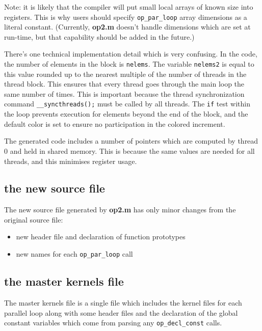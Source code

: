 \documentclass[12pt]{article}
\begin{document}
\newpage

Note: it is likely that the compiler will put small local arrays of 
known size into registers.  This is why users should specify
{\tt op\_par\_loop} array dimensions as a literal constant.
(Currently, {\bf op2.m} doesn't handle dimensions which are set at 
run-time, but that capability should be added in the future.)

There's one technical implementation detail which is very confusing.
In the code, the number of elements in the block is {\tt nelems}.
The variable {\tt nelems2} is equal to this value rounded up to the 
nearest multiple of the number of threads in the thread block.
This ensures that every thread goes through the main loop the same 
number of times.  This is important because the thread synchronization 
command {\tt \_\_syncthreads();} must be called by all threads.
The {\tt if} test within the loop prevents execution for elements
beyond the end of the block, and the default color is set to ensure
no participation in the colored increment.

The generated code includes a number of pointers which are computed 
by thread 0 and held in shared memory.  This is because the same values 
are needed for all threads, and this minimises register usage.


\subsection{the new source file}

The new source file generated by {\bf op2.m} has only minor changes 
from the original source file:
\begin{itemize}
\item
new header file and declaration of function prototypes

\item
new names for each {\tt op\_par\_loop} call
\end{itemize}

\subsection{the master kernels file}

The master kernels file is a single file which includes the kernel 
files for each parallel loop along with some header files and the 
declaration of the global constant variables which come from parsing 
any {\tt op\_decl\_const} calls.
\end{document}
